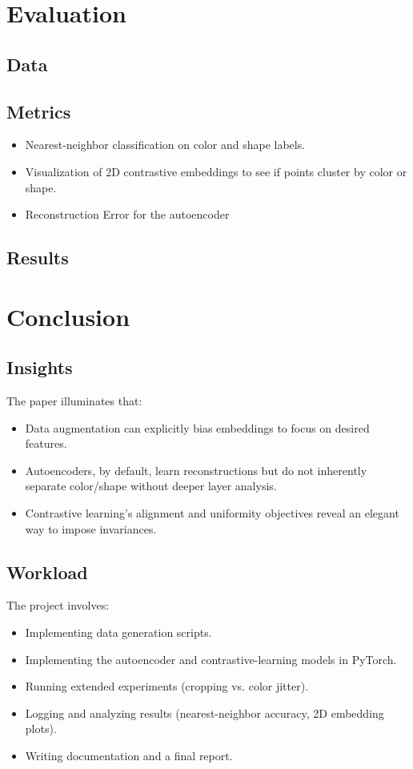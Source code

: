 \documentclass{article}
\begin{document}
\section{Evaluation}
\subsection{Data}
\subsection{Metrics}
\begin{itemize}
    \item Nearest-neighbor classification on color and shape labels.
    \item Visualization of 2D contrastive embeddings to see if points cluster by color or shape.
    \item Reconstruction Error for the autoencoder
\end{itemize}

\subsection{Results}
\section{Conclusion}
\subsection{Insights}
The paper illuminates that:
\begin{itemize}
    \item Data augmentation can explicitly bias embeddings to focus on desired features.
    \item Autoencoders, by default, learn reconstructions but do not inherently separate color/shape without deeper layer analysis.
    \item Contrastive learning’s alignment and uniformity objectives reveal an elegant way to impose invariances. 
\end{itemize}
\subsection{Workload}
The project involves:
\begin{itemize}
    \item Implementing data generation scripts.
    \item Implementing the autoencoder and contrastive-learning models in PyTorch.
    \item Running extended experiments (cropping vs. color jitter).
    \item Logging and analyzing results (nearest-neighbor accuracy, 2D embedding plots).
    \item Writing documentation and a final report. 
\end{itemize}
\end{document}
